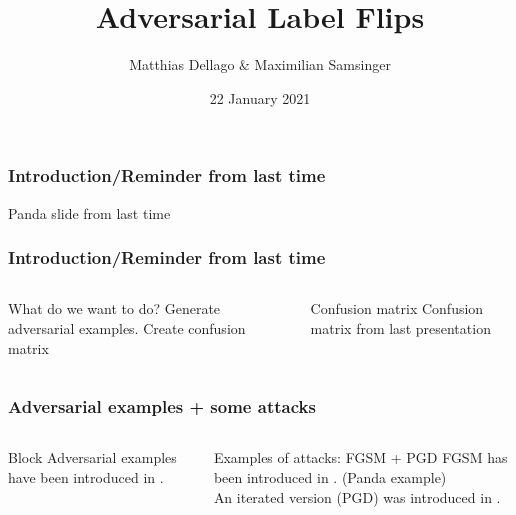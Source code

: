 \documentclass[10pt,usepdftitle=false,aspectratio=169]{beamer}
\title{Adversarial Label Flips}
\author{Matthias Dellago \& Maximilian Samsinger}
\date{22 January 2021}
\begin{document}
\DeclarePairedDelimiter\abs{\lvert}{\rvert}%
\DeclarePairedDelimiter\norm{\lVert}{\rVert}%
\DeclarePairedDelimiter\ceil{\lceil}{\rceil}
\DeclarePairedDelimiter\floor{\lfloor}{\rfloor}

\begin{frame}[plain]
	\maketitle
\end{frame}	

%
%

\begin{frame}[fragile]
	\frametitle{Introduction/Reminder from last time}
	Panda slide from last time
\end{frame}

\begin{frame}[fragile]
	\frametitle{Introduction/Reminder from last time}
	\begin{columns}
		\begin{column}{.5\columnwidth}
			\begin{block}{What do we want to do?}
				Generate adversarial examples. Create confusion matrix
			\end{block}
		\end{column}
		\begin{column}{.5\columnwidth}
			\begin{exampleblock}{Confusion matrix}
				Confusion matrix from last presentation
			\end{exampleblock}
		\end{column}
	\end{columns}
\end{frame}

\begin{frame}[fragile]
	\frametitle{Adversarial examples + some attacks}
	\begin{columns}
		\begin{column}{.5\columnwidth}
			\begin{block}{Block}
				Adversarial examples have been introduced in \cite{Szegedy13}.
			\end{block}
		\end{column}
		\begin{column}{.5\columnwidth}
			\begin{alertblock}{Examples of attacks: FGSM + PGD}
				FGSM has been introduced in \cite{goodfellow2014explaining}. (Panda example) \\
				An iterated version (PGD) was introduced in \cite{madry2017towards}. 
			\end{alertblock}
		\end{column}
	\end{columns}
\end{frame}
\end{document}
